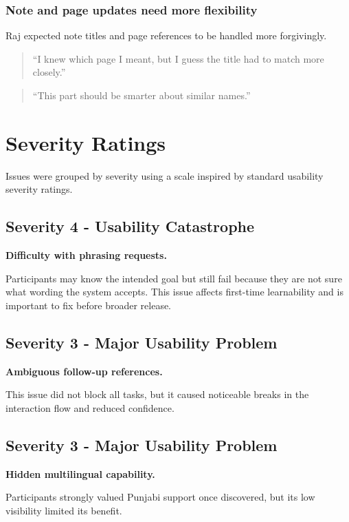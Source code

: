 \documentclass[12pt, titlepage]{article}
\begin{document}
\subsubsection{Note and page updates need more flexibility}

Raj expected note titles and page references to be handled more
forgivingly.

\begin{quote}
``I knew which page I meant, but I guess the title had to match more
closely.''
\end{quote}

\begin{quote}
``This part should be smarter about similar names.''
\end{quote}

\section{Severity Ratings}

Issues were grouped by severity using a scale inspired by standard
usability severity ratings.

\subsection{Severity 4 - Usability Catastrophe}

\textbf{Difficulty with phrasing requests.}

Participants may know the intended goal but still fail because they are
not sure what wording the system accepts. This issue affects first-time
learnability and is important to fix before broader release.

\subsection{Severity 3 - Major Usability Problem}

\textbf{Ambiguous follow-up references.}

This issue did not block all tasks, but it caused noticeable breaks in
the interaction flow and reduced confidence.

\subsection{Severity 3 - Major Usability Problem}

\textbf{Hidden multilingual capability.}

Participants strongly valued Punjabi support once discovered, but its low
visibility limited its benefit.
\end{document}
